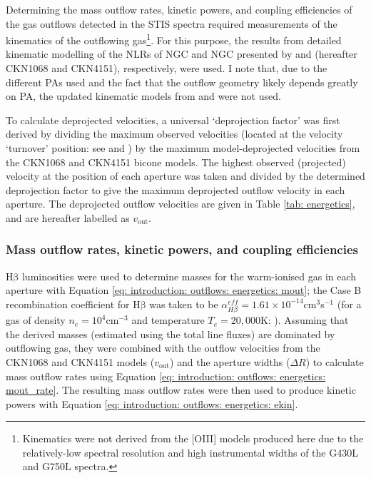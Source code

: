Determining the mass outflow rates, kinetic powers, and coupling efficiencies of the gas outflows detected in the STIS spectra required measurements of the kinematics of the outflowing gas\footnote{Kinematics were not derived from the [OIII] models produced here due to the relatively-low spectral resolution and high instrumental widths of the G430L and G750L spectra.}. For this purpose, the results from detailed kinematic modelling of the NLRs of NGC and NGC presented by \citet{Crenshaw2000_N1068} and \citet{Crenshaw2000_N4151} (hereafter CKN1068 and CKN4151), respectively, were used. I note that, due to the different PAs used and the fact that the outflow geometry likely depends greatly on PA, the updated kinematic models from \citet{Das2005} and \citet{Das2006} were not used. 

To calculate deprojected velocities, a universal `deprojection factor' was first derived by dividing the maximum observed velocities (located at the velocity `turnover' position: see \citealt{Crenshaw2000_N1068} and \citealt{Crenshaw2000_N4151}) by the maximum model-deprojected velocities from the CKN1068 and CKN4151 bicone models. The highest observed (projected) velocity at the position of each aperture was taken and divided by the determined deprojection factor to give the maximum deprojected outflow velocity in each aperture. The deprojected outflow velocities are given in Table \ref{tab: energetics}, and are hereafter labelled as $v_\mathrm{out}$.

\subsubsection{Mass outflow rates, kinetic powers, and coupling efficiencies}
\label{section: stis_seyferts: mout_ekin_fkin}

H$\mathrm{\beta}$ luminosities were used to determine masses for the warm-ionised gas in each aperture with Equation \ref{eq: introduction: outflows: energetics: mout}; the Case B recombination coefficient for H$\mathrm{\beta}$ was taken to be $\alpha^{eff}_{H\beta}=1.61\times10^{-14}$\;cm$^3$\;s$^{-1}$ (for a gas of density $n_e=10^4$\;cm$^{-3}$ and temperature $T_e=20,000$\;K: \citealt{Osterbrock2006}). Assuming that the derived masses (estimated using the total line fluxes) are dominated by outflowing gas, they were combined with the outflow velocities from the CKN1068 and CKN4151 models ($v_\mathrm{out}$) and the aperture widths ($\Delta R$) to calculate mass outflow rates using Equation \ref{eq: introduction: outflows: energetics: mout_rate}. The resulting mass outflow rates were then used to produce kinetic powers with Equation \ref{eq: introduction: outflows: energetics: ekin}.

